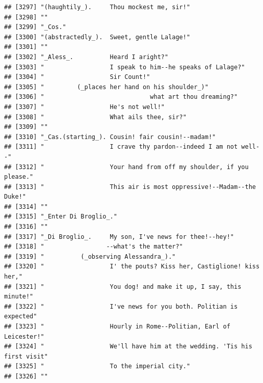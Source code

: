 \documentclass{article}\usepackage[]{graphicx}\usepackage[]{color}
\makeatletter
\newenvironment{kframe}{%
 \def\at@end@of@kframe{}%
 \ifinner\ifhmode%
  \def\at@end@of@kframe{\end{minipage}}%
  \begin{minipage}{\columnwidth}%
 \fi\fi%
 \def\FrameCommand##1{\hskip\@totalleftmargin \hskip-\fboxsep
 \colorbox{shadecolor}{##1}\hskip-\fboxsep
     \hskip-\linewidth \hskip-\@totalleftmargin \hskip\columnwidth}%
 \MakeFramed {\advance\hsize-\width
   \@totalleftmargin\z@ \linewidth\hsize
   \@setminipage}}%
 {\par\unskip\endMakeFramed%
 \at@end@of@kframe}
\newenvironment{knitrout}{}{} %
\makeatother
\begin{document}
\begin{knitrout}
\begin{kframe}
\begin{verbatim}
## [3297] "(haughtily_).     Thou mockest me, sir!"                                     
## [3298] ""                                                                            
## [3299] "_Cos."                                                                       
## [3300] "(abstractedly_).  Sweet, gentle Lalage!"                                     
## [3301] ""                                                                            
## [3302] "_Aless_.          Heard I aright?"                                           
## [3303] "                  I speak to him--he speaks of Lalage?"                      
## [3304] "                  Sir Count!"                                                
## [3305] "         (_places her hand on his shoulder_)"                                
## [3306] "                             what art thou dreaming?"                        
## [3307] "                  He's not well!"                                            
## [3308] "                  What ails thee, sir?"                                      
## [3309] ""                                                                            
## [3310] "_Cas.(starting_). Cousin! fair cousin!--madam!"                              
## [3311] "                  I crave thy pardon--indeed I am not well--"                
## [3312] "                  Your hand from off my shoulder, if you please."            
## [3313] "                  This air is most oppressive!--Madam--the Duke!"            
## [3314] ""                                                                            
## [3315] "_Enter Di Broglio_."                                                         
## [3316] ""                                                                            
## [3317] "_Di Broglio_.     My son, I've news for thee!--hey!"                         
## [3318] "                 --what's the matter?"                                       
## [3319] "          (_observing Alessandra_)."                                         
## [3320] "                  I' the pouts? Kiss her, Castiglione! kiss her,"            
## [3321] "                  You dog! and make it up, I say, this minute!"              
## [3322] "                  I've news for you both. Politian is expected"              
## [3323] "                  Hourly in Rome--Politian, Earl of Leicester!"              
## [3324] "                  We'll have him at the wedding. 'Tis his first visit"       
## [3325] "                  To the imperial city."                                     
## [3326] ""                                                                            

\end{verbatim}
\end{kframe}
\end{knitrout}
\end{document}
